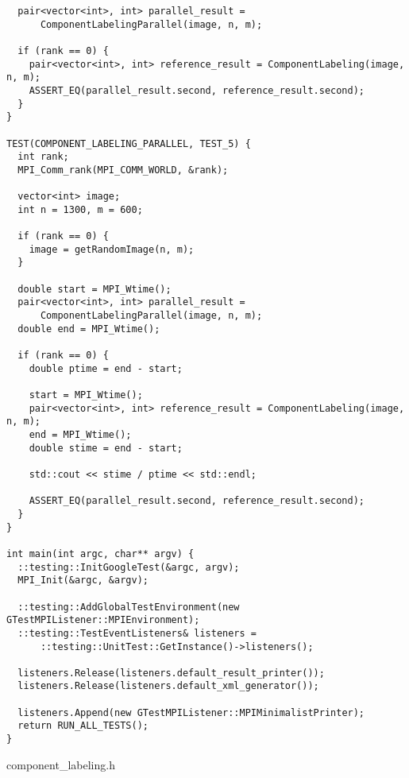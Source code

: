 \documentclass{report}
\begin{document}
\begin{lstlisting}
  pair<vector<int>, int> parallel_result =
      ComponentLabelingParallel(image, n, m);

  if (rank == 0) {
    pair<vector<int>, int> reference_result = ComponentLabeling(image, n, m);
    ASSERT_EQ(parallel_result.second, reference_result.second);
  }
}

TEST(COMPONENT_LABELING_PARALLEL, TEST_5) {
  int rank;
  MPI_Comm_rank(MPI_COMM_WORLD, &rank);

  vector<int> image;
  int n = 1300, m = 600;

  if (rank == 0) {
    image = getRandomImage(n, m);
  }

  double start = MPI_Wtime();
  pair<vector<int>, int> parallel_result =
      ComponentLabelingParallel(image, n, m);
  double end = MPI_Wtime();

  if (rank == 0) {
    double ptime = end - start;

    start = MPI_Wtime();
    pair<vector<int>, int> reference_result = ComponentLabeling(image, n, m);
    end = MPI_Wtime();
    double stime = end - start;

    std::cout << stime / ptime << std::endl;

    ASSERT_EQ(parallel_result.second, reference_result.second);
  }
}

int main(int argc, char** argv) {
  ::testing::InitGoogleTest(&argc, argv);
  MPI_Init(&argc, &argv);

  ::testing::AddGlobalTestEnvironment(new GTestMPIListener::MPIEnvironment);
  ::testing::TestEventListeners& listeners =
      ::testing::UnitTest::GetInstance()->listeners();

  listeners.Release(listeners.default_result_printer());
  listeners.Release(listeners.default_xml_generator());

  listeners.Append(new GTestMPIListener::MPIMinimalistPrinter);
  return RUN_ALL_TESTS();
}
\end{lstlisting}
component\_labeling.h
\end{document}
